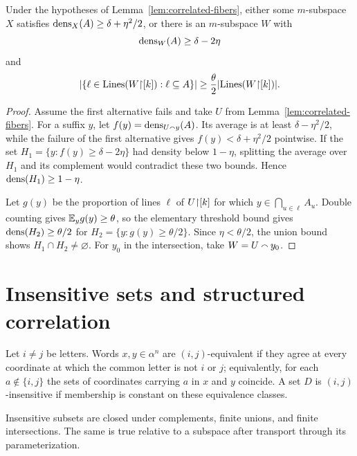 \begin{lemma}
\label{lem:many-lines}
Under the hypotheses of Lemma~\ref{lem:correlated-fibers}, either some $m$-subspace $X$ satisfies
$\operatorname{dens}_X(A)\geq\delta+\eta^2/2$, or there is an $m$-subspace $W$ with
\[
 \operatorname{dens}_W(A)\geq\delta-2\eta
\]
and
\[
 \lvert \{\ell\in\operatorname{Lines}(W\mathord{\upharpoonright}[k]):\ell\subseteq A\}\rvert
 \geq\frac\theta2\lvert \operatorname{Lines}(W\mathord{\upharpoonright}[k])\rvert.
\]
\end{lemma}

\begin{proof}
Assume the first alternative fails and take $U$ from Lemma~\ref{lem:correlated-fibers}.  For a
suffix $y$, let $f(y)=\operatorname{dens}_{U\mathbin{\smallfrown} y}(A)$.  Its average is at least
$\delta-\eta^2/2$, while the failure of the first alternative gives
$f(y)<\delta+\eta^2/2$ pointwise.  If the set $H_1=\{y:f(y)\geq\delta-2\eta\}$ had density below
$1-\eta$, splitting the average over $H_1$ and its complement would contradict these two bounds.
Hence $\operatorname{dens}(H_1)\geq1-\eta$.

Let $g(y)$ be the proportion of lines $\ell$ of $U\mathord{\upharpoonright}[k]$ for which
$y\in\bigcap_{u\in\ell}A_u$.  Double counting gives $\mathbb{E}_y g(y)\geq\theta$, so the elementary
threshold bound gives $\operatorname{dens}(H_2)\geq\theta/2$ for
$H_2=\{y:g(y)\geq\theta/2\}$.  Since $\eta<\theta/2$, the union bound shows
$H_1\cap H_2\neq\varnothing$.  For $y_0$ in the intersection, take $W=U\mathbin{\smallfrown} y_0$.
\end{proof}

\section{Insensitive sets and structured correlation}

\begin{definition}
\label{def:insensitive}
Let $i\neq j$ be letters.  Words $x,y\in\alpha^n$ are $(i,j)$-equivalent if they agree at every
coordinate at which the common letter is not $i$ or $j$; equivalently, for each
$a\notin\{i,j\}$ the sets of coordinates carrying $a$ in $x$ and $y$ coincide.  A set $D$ is
$(i,j)$-insensitive if membership is constant on these equivalence classes.
\end{definition}

\begin{lemma}
\label{lem:insensitive-boolean}
Insensitive subsets are closed under complements, finite unions, and finite intersections.  The
same is true relative to a subspace after transport through its parameterization.
\end{lemma}

